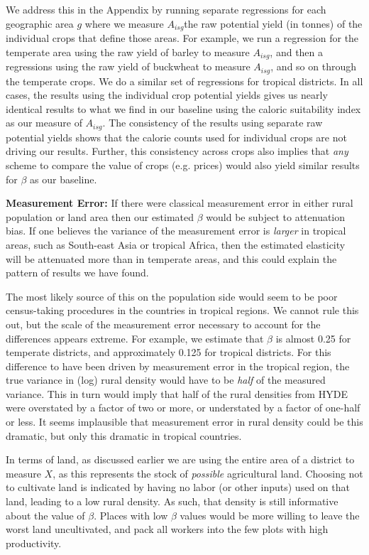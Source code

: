 \documentclass[11pt]{article}
\begin{document}
We address this in the Appendix by running separate regressions for each geographic area $g$ where we measure $A_{isg}$the raw potential yield (in tonnes) of the individual crops that define those areas. For example, we run a regression for the temperate area using the raw yield of barley to measure $A_{isg}$, and then a regressions using the raw yield of buckwheat to measure $A_{isg}$, and so on through the temperate crops. We do a similar set of regressions for tropical districts. In all cases, the results using the individual crop potential yields gives us nearly identical results to what we find in our baseline using the caloric suitability index as our measure of $A_{isg}$. The consistency of the results using separate raw potential yields shows that the calorie counts used for individual crops are not driving our results. Further, this consistency across crops also implies that \textit{any} scheme to compare the value of crops (e.g. prices) would also yield similar results for $\beta$ as our baseline.

\vspace{.5cm}\noindent\textbf{Measurement Error:} If there were classical measurement error in either rural population or land area then our estimated $\beta$ would be subject to attenuation bias. If one believes the variance of the measurement error is \textit{larger} in tropical areas, such as South-east Asia or tropical Africa, then the estimated elasticity will be attenuated more than in temperate areas, and this could explain the pattern of results we have found. 

The most likely source of this on the population side would seem to be poor census-taking procedures in the countries in tropical regions. We cannot rule this out, but the scale of the measurement error necessary to account for the differences appears extreme. For example, we estimate that $\beta$ is almost 0.25 for temperate districts, and approximately 0.125 for tropical districts. For this difference to have been driven by measurement error in the tropical region, the true variance in (log) rural density would have to be \textit{half} of the measured variance. This in turn would imply that half of the rural densities from HYDE were overstated by a factor of two or more, or understated by a factor of one-half or less. It seems implausible that measurement error in rural density could be this dramatic, but only this dramatic in tropical countries.

In terms of land, as discussed earlier we are using the entire area of a district to measure $X$, as this represents the stock of \textit{possible} agricultural land. Choosing not to cultivate land is indicated by having no labor (or other inputs) used on that land, leading to a low rural density. As such, that density is still informative about the value of $\beta$. Places with low $\beta$ values would be more willing to leave the worst land uncultivated, and pack all workers into the few plots with high productivity. 
\end{document}
